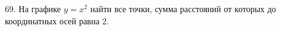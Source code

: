 69. На графике $y=x^2$ найти все точки, сумма расстояний от которых до координатных осей равна 2.\\
